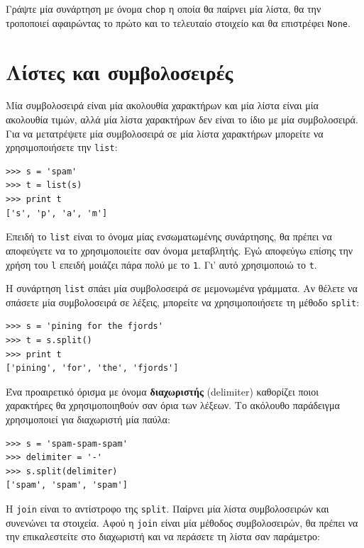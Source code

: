 \documentclass[10pt]{book}
\begin{document}
\begin{exercise}

Γράψτε μία συνάρτηση με όνομα \verb"chop" η οποία θα παίρνει μία λίστα, θα την τροποποιεί αφαιρώντας το πρώτο και το τελευταίο στοιχείο και θα επιστρέφει  {\tt None}. 
\end{exercise}


\section{Λίστες και συμβολοσειρές}

Μία συμβολοσειρά είναι μία ακολουθία χαρακτήρων και μία λίστα είναι μία ακολουθία τιμών, αλλά μία λίστα χαρακτήρων δεν είναι το ίδιο με μία συμβολοσειρά. Για να μετατρέψετε μία συμβολοσειρά σε μία λίστα χαρακτήρων μπορείτε να χρησιμοποιήσετε την {\tt list}:

\begin{verbatim}
>>> s = 'spam'
>>> t = list(s)
>>> print t
['s', 'p', 'a', 'm']
\end{verbatim}
%

Επειδή το {\tt list} είναι το όνομα μίας ενσωματωμένης συνάρτησης, θα πρέπει να αποφεύγετε να το χρησιμοποιείτε σαν όνομα μεταβλητής. Εγώ αποφεύγω επίσης την χρήση του {\tt l} επειδή μοιάζει πάρα πολύ με το {\tt 1}. Γι' αυτό χρησιμοποιώ το {\tt t}.

Η συνάρτηση {\tt list} σπάει μία συμβολοσειρά σε μεμονωμένα γράμματα. Αν θέλετε να σπάσετε μία συμβολοσειρά σε λέξεις, μπορείτε να χρησιμοποιήσετε τη μέθοδο {\tt split}:

\begin{verbatim}
>>> s = 'pining for the fjords'
>>> t = s.split()
>>> print t
['pining', 'for', 'the', 'fjords']
\end{verbatim}
%
Ένα προαιρετικό όρισμα με όνομα {\bf διαχωριστής} (delimiter) καθορίζει ποιοι χαρακτήρες θα χρησιμοποιηθούν σαν όρια των λέξεων. Το ακόλουθο παράδειγμα χρησιμοποιεί για διαχωριστή μία παύλα:

\begin{verbatim}
>>> s = 'spam-spam-spam'
>>> delimiter = '-'
>>> s.split(delimiter)
['spam', 'spam', 'spam']
\end{verbatim}
%

Η {\tt join} είναι το αντίστροφο της {\tt split}. Παίρνει μία λίστα συμβολοσειρών και συνενώνει τα στοιχεία. Αφού η {\tt join} είναι μία μέθοδος συμβολοσειρών, θα πρέπει να την επικαλεστείτε στο διαχωριστή και να περάσετε τη λίστα σαν παράμετρο:
\end{document}
